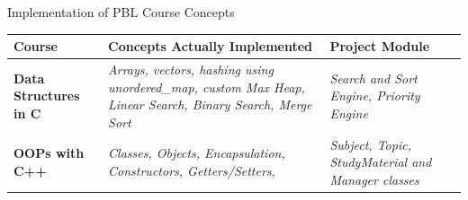 \documentclass[aspectratio=169,11pt]{beamer}
\newcommand{\placeholder}[1]{%
\textit{\color{GEUGrey}#1}
}
\begin{document}
\begin{frame}{Implementation of PBL Course Concepts}

\scriptsize

\begin{center}

\renewcommand{\arraystretch}{1.25}

\begin{tabularx}{.98\textwidth}
{@{}>{\bfseries}p{2.8cm}X p{2.8cm}@{}}

\toprule
Course & Concepts Actually Implemented & Project Module\\
\midrule

Data Structures in C &
\placeholder{Arrays, vectors, hashing using unordered\_map, custom Max Heap, Linear Search, Binary Search, Merge Sort} &
\placeholder{Search and Sort Engine, Priority Engine}\\

OOPs with C++ &
\placeholder{Classes, Objects, Encapsulation, Constructors, Getters/Setters, } &
\placeholder{Subject, Topic, StudyMaterial and Manager classes }\\

\midrule


\end{tabularx}

\end{center}

\vfill


\end{frame}
\end{document}
